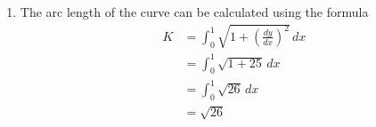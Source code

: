 \documentclass[10pt,openany,a4paper]{article}
\theoremstyle{definition}
\theoremstyle{definition}
\theoremstyle{plain}
\begin{document}
\begin{enumerate}
\begin{enumerate}
        By Pappus the surface area is
        \[ S=L\cdot(2\pi\bar{x}_{\text{arc}})=\pi\cdot2\pi\cdot\frac{4}{\pi}=8\pi.\]

        To locate the centroid of the surface (distance from the $y$-axis) compute
        \[ \bar{x}_{\text{surf}}=\frac{1}{S}\int x\,dS=\frac{1}{S}\int(2\pi x)\,x\,ds=\frac{2\pi\int x^2\,ds}{S}.\]
        Here
        \[ \int x^2\,ds=\int_0^{\pi/2}(2\cos\theta)^2(2\,d\theta)=8\int_0^{\pi/2}\cos^2\theta\,d\theta=8\cdot\frac{\pi}{4}=2\pi.\]
        Hence
        \[ \bar{x}_{\text{surf}}=\frac{2\pi\cdot2\pi}{8\pi}=\frac{\pi}{2}.\]

        Therefore the centroid of the resulting surface is located on the $x$-axis at a distance $\displaystyle\bar{x}_{\text{surf}}=\frac{\pi}{2}$ from the $y$-axis, i.e. at $\left(\dfrac{\pi}{2},0\right)$.
    \end{enumerate}
    \item The arc length of the curve can be calculated using the formula
    \begin{align*}
        K &= \int_{0}^{1} \sqrt{1 + \left(\frac{dy}{dx}\right)^2} \, dx \\
        &= \int_{0}^{1} \sqrt{1 + 25} \, dx \\
        &= \int_{0}^{1} \sqrt{26} \, dx \\
        &= \sqrt{26}
    \end{align*}
    \end{enumerate}
\end{document}
